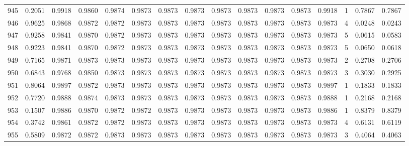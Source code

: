 \begin{tabular}{lrrrrrrrrrrrrrrr}
945 &      0.2051 &  0.9918 &  0.9860 &  0.9874 &  0.9873 &  0.9873 &  0.9873 &  0.9873 &  0.9873 &  0.9873 &   0.9873 &     0.9918 &      1 &                    0.7867 &                     0.7867 \\
946 &      0.9625 &  0.9868 &  0.9872 &  0.9872 &  0.9873 &  0.9873 &  0.9873 &  0.9873 &  0.9873 &  0.9873 &   0.9873 &     0.9873 &      4 &                    0.0248 &                     0.0243 \\
947 &      0.9258 &  0.9841 &  0.9870 &  0.9872 &  0.9873 &  0.9873 &  0.9873 &  0.9873 &  0.9873 &  0.9873 &   0.9873 &     0.9873 &      5 &                    0.0615 &                     0.0583 \\
948 &      0.9223 &  0.9841 &  0.9870 &  0.9872 &  0.9873 &  0.9873 &  0.9873 &  0.9873 &  0.9873 &  0.9873 &   0.9873 &     0.9873 &      5 &                    0.0650 &                     0.0618 \\
949 &      0.7165 &  0.9871 &  0.9873 &  0.9873 &  0.9873 &  0.9873 &  0.9873 &  0.9873 &  0.9873 &  0.9873 &   0.9873 &     0.9873 &      2 &                    0.2708 &                     0.2706 \\
950 &      0.6843 &  0.9768 &  0.9850 &  0.9873 &  0.9873 &  0.9873 &  0.9873 &  0.9873 &  0.9873 &  0.9873 &   0.9873 &     0.9873 &      3 &                    0.3030 &                     0.2925 \\
951 &      0.8064 &  0.9897 &  0.9872 &  0.9873 &  0.9873 &  0.9873 &  0.9873 &  0.9873 &  0.9873 &  0.9873 &   0.9873 &     0.9897 &      1 &                    0.1833 &                     0.1833 \\
952 &      0.7720 &  0.9888 &  0.9874 &  0.9873 &  0.9873 &  0.9873 &  0.9873 &  0.9873 &  0.9873 &  0.9873 &   0.9873 &     0.9888 &      1 &                    0.2168 &                     0.2168 \\
953 &      0.1507 &  0.9886 &  0.9870 &  0.9872 &  0.9872 &  0.9873 &  0.9873 &  0.9873 &  0.9873 &  0.9873 &   0.9873 &     0.9886 &      1 &                    0.8379 &                     0.8379 \\
954 &      0.3742 &  0.9861 &  0.9872 &  0.9872 &  0.9873 &  0.9873 &  0.9873 &  0.9873 &  0.9873 &  0.9873 &   0.9873 &     0.9873 &      4 &                    0.6131 &                     0.6119 \\
955 &      0.5809 &  0.9872 &  0.9872 &  0.9873 &  0.9873 &  0.9873 &  0.9873 &  0.9873 &  0.9873 &  0.9873 &   0.9873 &     0.9873 &      3 &                    0.4064 &                     0.4063 \\

\end{tabular}
